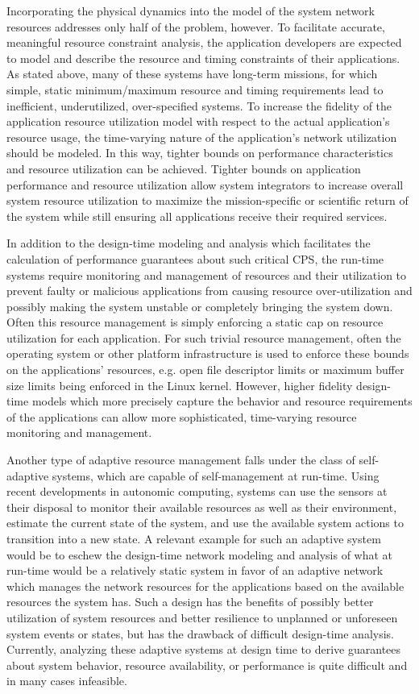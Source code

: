 Incorporating the physical dynamics into the model of the system
network resources addresses only half of the problem, however.  To
facilitate accurate, meaningful resource constraint analysis, the
application developers are expected to model and describe the resource
and timing constraints of their applications.  As stated above, many
of these systems have long-term missions, for which simple, static
minimum/maximum resource and timing requirements lead to inefficient,
underutilized, over-specified systems.  To increase the fidelity of
the application resource utilization model with respect to the actual
application's resource usage, the time-varying nature of the
application's network utilization should be modeled.  In this way,
tighter bounds on performance characteristics and resource utilization
can be achieved.  Tighter bounds on application performance and
resource utilization allow system integrators to increase overall
system resource utilization to maximize the mission-specific or
scientific return of the system while still ensuring all applications
receive their required services.

In addition to the design-time modeling and analysis which facilitates
the calculation of performance guarantees about such critical CPS, the
run-time systems require monitoring and management of resources and
their utilization to prevent faulty or malicious applications from
causing resource over-utilization and possibly making the system
unstable or completely bringing the system down.  Often this resource
management is simply enforcing a static cap on resource utilization
for each application.  For such trivial resource management, often the
operating system or other platform infrastructure is used to enforce
these bounds on the applications' resources, e.g. open file descriptor
limits or maximum buffer size limits being enforced in the Linux
kernel.  However, higher fidelity design-time models which more
precisely capture the behavior and resource requirements of the
applications can allow more sophisticated, time-varying resource
monitoring and management.

Another type of adaptive resource management falls under the class of
self-adaptive systems, which are capable of self-management at
run-time.  Using recent developments in autonomic computing, systems
can use the sensors at their disposal to monitor their available
resources as well as their environment, estimate the current state of
the system, and use the available system actions to transition into a
new state\cite{ibmAutonomicComputing2003}.  A relevant example for
such an adaptive system would be to eschew the design-time network
modeling and analysis of what at run-time would be a relatively static
system in favor of an adaptive network which manages the network
resources for the applications based on the available resources the
system has.  Such a design has the benefits of possibly better
utilization of system resources and better resilience to unplanned or
unforeseen system events or states, but has the drawback of difficult
design-time analysis.  Currently, analyzing these adaptive systems at
design time to derive guarantees about system behavior, resource
availability, or performance is quite difficult and in many cases
infeasible.

